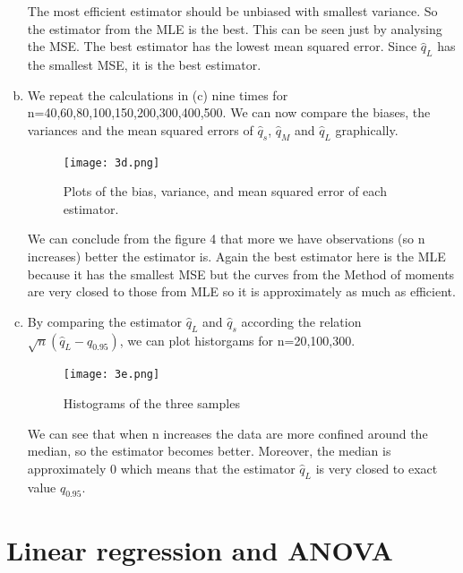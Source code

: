 \documentclass[a4paper]{article}
\begin{document}
\begin{enumerate}[(a)]
The most efficient estimator should be unbiased with smallest variance. So the estimator from the MLE is the best. This can be seen just by analysing the MSE. The best estimator has the lowest mean squared error. Since $\hat{q}_L$ has the smallest MSE, it is the best estimator.
\\

\item We repeat the calculations in (c) nine times for n=40,60,80,100,150,200,300,400,500. We can now compare the biases, the variances and the mean squared errors of $\hat{q}_s$, $\hat{q}_M$ and $\hat{q}_L$ graphically. 

\begin{figure}[!h]
    \centering
  \texttt{[image: 3d.png]}
  \caption{Plots of the bias, variance, and mean squared error of each estimator.}
\end{figure}

We can conclude from the figure 4 that more we have observations (so n increases) better the estimator is. Again the best estimator here is the MLE because it has the smallest MSE but the curves from the Method of moments are very closed to those from MLE so it is approximately as much as efficient.


\item By comparing the estimator $\hat{q}_L$ and $\hat{q}_s$ according the relation $\sqrt{n}(\hat{q}_L-q_{0.95})$, we can plot historgams for n=20,100,300.

\begin{figure}[!h]
    \centering
  \texttt{[image: 3e.png]}
  \caption{Histograms of the three samples}
\end{figure}

We can see that when n increases the data are more confined around the median, so the estimator becomes better. Moreover, the median is approximately 0 which means that the estimator $\hat{q}_L$ is very closed to exact value  $q_{0.95}$.


\end{enumerate}




\newpage

\section{Linear regression and ANOVA}
\end{document}
